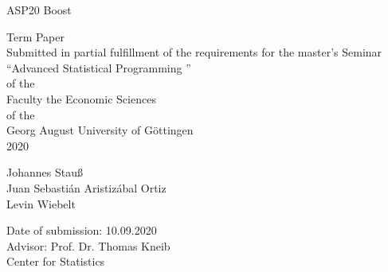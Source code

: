 \begin{titlepage}
\vspace*{3.5cm}
\centering
{\LARGE ASP20 Boost}\\[2\baselineskip]
{\large  Term Paper  \\
 Submitted in partial fulfillment of the requirements for the  master's Seminar\\
\textquotedblleft Advanced Statistical Programming \textquotedblright\ \\
of the \\
Faculty the Economic Sciences \\
of the \\
Georg August University of Göttingen\\
2020 \par}
\vspace*{\fill}
\begin{flushleft}
Johannes Stauß\\
Juan Sebastián Aristizábal Ortiz\\
Levin Wiebelt

Date of submission: 10.09.2020\\
\vspace{10mm}
Advisor: Prof. Dr. Thomas Kneib\\
Center for Statistics\\
\end{flushleft}
\thispagestyle{empty}
\end{titlepage}
